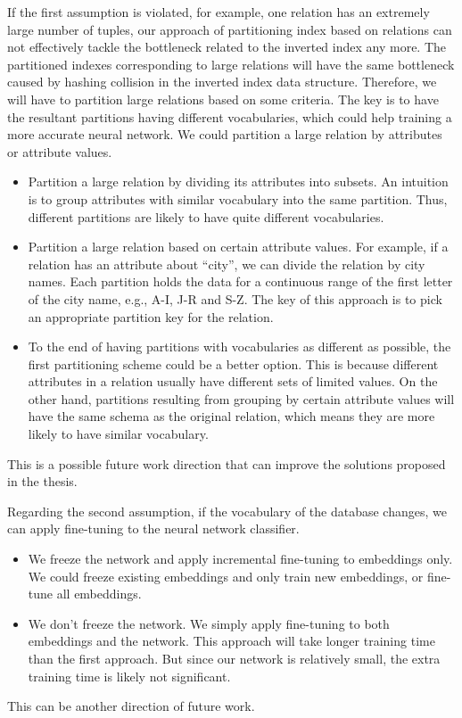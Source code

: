 If the first assumption is violated, for example, one relation has an extremely large number of tuples, our approach of partitioning index based on relations can not effectively tackle the bottleneck related to the inverted index any more. The partitioned indexes corresponding to large relations will have the same bottleneck caused by hashing collision in the inverted index data structure. Therefore, we will have to partition large relations based on some criteria. The key is to have the resultant partitions having different vocabularies, which could help training a more accurate neural network. We could partition a large relation by attributes or attribute values.
\begin{itemize}
    \item Partition a large relation by dividing its attributes into subsets. An intuition is to group attributes with similar vocabulary into the same partition. Thus, different partitions are likely to have quite different vocabularies. 
    \item Partition a large relation based on certain attribute values. For example, if a relation has an attribute about ``city'', we can divide the relation by city names. Each partition holds the data for a continuous range of the first letter of the city name, e.g., A-I, J-R and S-Z. The key of this approach is to pick an appropriate partition key for the relation.
    \item To the end of having partitions with vocabularies as different as possible, the first partitioning scheme could be a better option. This is because different attributes in a relation usually have different sets of limited values. On the other hand, partitions resulting from grouping by certain attribute values will have the same schema as the original relation, which means they are more likely to have similar vocabulary.
\end{itemize}
This is a possible future work direction that can improve the solutions proposed in the thesis.

Regarding the second assumption, if the vocabulary of the database changes, we can apply fine-tuning to the neural network classifier.
\begin{itemize}
    \item We freeze the network and apply incremental fine-tuning to embeddings only. We could freeze existing embeddings and only train new embeddings, or fine-tune all embeddings.
    \item We don't freeze the network. We simply apply fine-tuning to both embeddings and the network. This approach will take longer training time than the first approach. But since our network is relatively small, the extra training time is likely not significant.
\end{itemize}
This can be another direction of future work.

